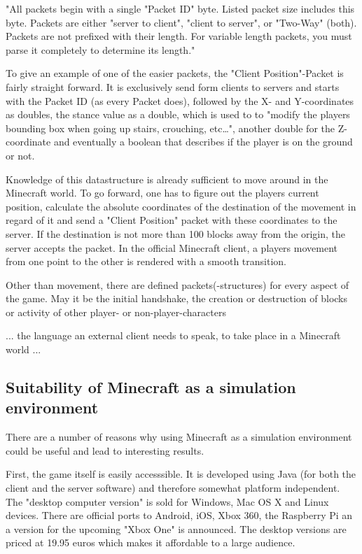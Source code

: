 "All packets begin with a single "Packet ID" byte. Listed packet size includes this byte. Packets are either "server to client", "client to server", or "Two-Way" (both). Packets are not prefixed with their length. For variable length packets, you must parse it completely to determine its length." 

To give an example of one of the easier packets, the "Client Position"-Packet is fairly straight forward. It is exclusively send form clients to servers and starts with the Packet ID (as every Packet does), followed by the X- and Y-coordinates as doubles, the stance value as a double, which is used to to "modify the players bounding box when going up stairs, crouching, etc…", another double for the Z-coordinate and eventually a boolean that describes if the player is on the ground or not.~\cite{protocol}

Knowledge of this datastructure is already sufficient to move around in the Minecraft world. To go forward, one has to figure out the players current position, calculate the absolute coordinates of the destination of the movement in regard of it and send a "Client Position" packet with these coordinates to the server. If the destination is not more than 100 blocks away from the origin, the server accepts the packet. In the official Minecraft client, a players movement from one point to the other is rendered with a smooth transition.

Other than movement, there are defined packets(-structures) for every aspect of the game. May it be the initial handshake, the creation or destruction of blocks or activity of other player- or non-player-characters

... the language an external client needs to speak, to take place in a Minecraft world ...

        \subsection{Suitability of Minecraft as a simulation environment}
There are a number of reasons why using Minecraft as a simulation environment could be useful and lead to interesting results.

First, the game itself is easily accesssible. It is developed using Java (for both the client and the server software) and therefore somewhat platform independent. The "desktop computer version" is sold for Windows, Mac OS X and Linux devices. There are official ports to Android, iOS, Xbox 360, the Raspberry Pi an a version for the upcoming "Xbox One" is announced. The desktop versions are priced at 19.95 euros  which makes it affordable to a large audience.

